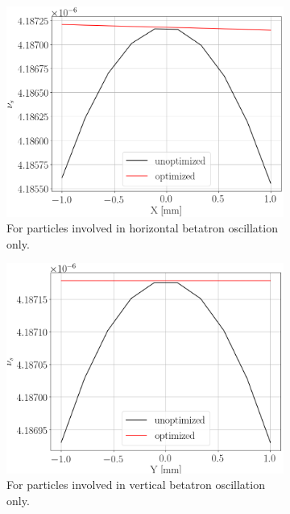 \documentclass[a4paper]{jacow}
\newcommand{\subwidth}{.9\linewidth}
\begin{document}
\begin{figure}[ht]
  \centering
  \begin{subfigure}{\subwidth}
    \centering
    \includegraphics[width=\linewidth]{../img/IPAC19/spin_tune_decoh_x_offset}
    \caption{For particles involved in horizontal betatron oscillation only.\label{fig:st_decoh_horizontal}}
  \end{subfigure}
  \begin{subfigure}{\subwidth}
    \centering
    \includegraphics[width=\linewidth]{../img/IPAC19/spin_tune_decoh_y_offset}
    \caption{For particles involved in vertical betatron oscillation only.}
  \end{subfigure}
  \begin{subfigure}{\subwidth}

\end{subfigure}
\end{figure}
\end{document}
